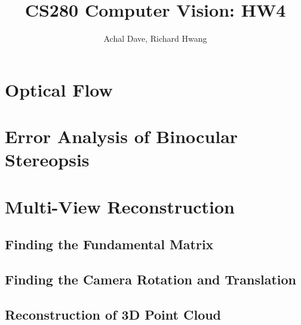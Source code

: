 \documentclass[11pt]{article}
\begin{document}
\title{CS280 Computer Vision: HW4}
\author{Achal Dave, Richard Hwang}
\maketitle

\section{Optical Flow}

\section{Error Analysis of Binocular Stereopsis}

\section{Multi-View Reconstruction}
\subsection{Finding the Fundamental Matrix}
\subsection{Finding the Camera Rotation and Translation}
\subsection{Reconstruction of 3D Point Cloud}
\end{document}
